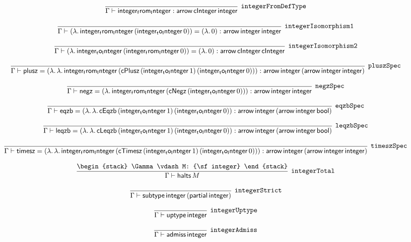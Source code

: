 \[
\infer[{\tt integerFromDefType}]{\Gamma \vdash {\sf integer_from_Integer}: {\sf arrow}\,{\sf cInteger}\,{\sf integer}}{}
\]

\[
\infer[{\tt integerIsomorphism1}]{\Gamma \vdash (\lambda .\,{\sf integer_from_Integer}\,({\sf integer_to_Integer}\,0))= (\lambda .\,0): {\sf arrow}\,{\sf integer}\,{\sf integer}}{}
\]

\[
\infer[{\tt integerIsomorphism2}]{\Gamma \vdash (\lambda .\,{\sf integer_to_Integer}\,({\sf integer_from_Integer}\,0))= (\lambda .\,0): {\sf arrow}\,{\sf cInteger}\,{\sf cInteger}}{}
\]

\[
\infer[{\tt pluszSpec}]{\Gamma \vdash {\sf plusz}= (\lambda .\,\lambda .\,{\sf integer_from_Integer}\,({\sf cPlusz}\,({\sf integer_to_Integer}\,1)\,({\sf integer_to_Integer}\,0))): {\sf arrow}\,{\sf integer}\,({\sf arrow}\,{\sf integer}\,{\sf integer})}{}
\]

\[
\infer[{\tt negzSpec}]{\Gamma \vdash {\sf negz}= (\lambda .\,{\sf integer_from_Integer}\,({\sf cNegz}\,({\sf integer_to_Integer}\,0))): {\sf arrow}\,{\sf integer}\,{\sf integer}}{}
\]

\[
\infer[{\tt eqzbSpec}]{\Gamma \vdash {\sf eqzb}= (\lambda .\,\lambda .\,{\sf cEqzb}\,({\sf integer_to_Integer}\,1)\,({\sf integer_to_Integer}\,0)): {\sf arrow}\,{\sf integer}\,({\sf arrow}\,{\sf integer}\,{\sf bool})}{}
\]

\[
\infer[{\tt leqzbSpec}]{\Gamma \vdash {\sf leqzb}= (\lambda .\,\lambda .\,{\sf cLeqzb}\,({\sf integer_to_Integer}\,1)\,({\sf integer_to_Integer}\,0)): {\sf arrow}\,{\sf integer}\,({\sf arrow}\,{\sf integer}\,{\sf bool})}{}
\]

\[
\infer[{\tt timeszSpec}]{\Gamma \vdash {\sf timesz}= (\lambda .\,\lambda .\,{\sf integer_from_Integer}\,({\sf cTimesz}\,({\sf integer_to_Integer}\,1)\,({\sf integer_to_Integer}\,0))): {\sf arrow}\,{\sf integer}\,({\sf arrow}\,{\sf integer}\,{\sf integer})}{}
\]

\[
\infer[{\tt integerTotal}]{\Gamma \vdash {\sf halts}\,M}{
\begin{stack}
\Gamma \vdash M: {\sf integer}
\end{stack}}
\]

\[
\infer[{\tt integerStrict}]{\Gamma \vdash {\sf subtype}\,{\sf integer}\,({\sf partial}\,{\sf integer})}{}
\]

\[
\infer[{\tt integerUptype}]{\Gamma \vdash {\sf uptype}\,{\sf integer}}{}
\]

\[
\infer[{\tt integerAdmiss}]{\Gamma \vdash {\sf admiss}\,{\sf integer}}{}
\]

